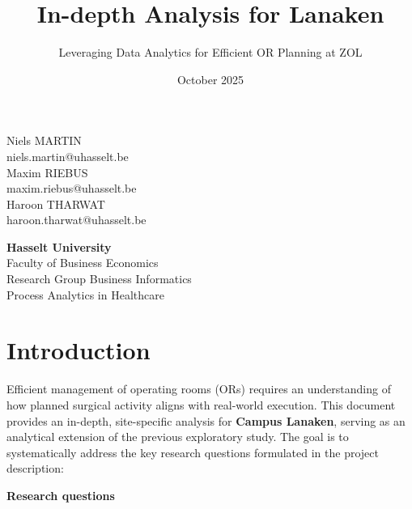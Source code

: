 \documentclass[
]{article}
\title{In-depth Analysis for Lanaken}
\subtitle{Leveraging Data Analytics for Efficient OR Planning at ZOL}
\author{}
\date{\vspace{-2.5em}October 2025}
\begin{document}
\maketitle

\begin{center}
\vspace{2cm}

Niels MARTIN\\
niels.martin@uhasselt.be\\[0.5em]
Maxim RIEBUS\\
maxim.riebus@uhasselt.be\\[0.5em]
Haroon THARWAT\\
haroon.tharwat@uhasselt.be\\

\vspace{6cm}

\textbf{Hasselt University} \\
Faculty of Business Economics \\
Research Group Business Informatics \\
Process Analytics in Healthcare
\end{center}

\newpage
\tableofcontents
\newpage

\section{Introduction}\label{introduction}

Efficient management of operating rooms (ORs) requires an understanding
of how planned surgical activity aligns with real-world execution. This
document provides an in-depth, site-specific analysis for \textbf{Campus
Lanaken}, serving as an analytical extension of the previous exploratory
study. The goal is to systematically address the key research questions
formulated in the project description:

\textbf{Research questions}
\end{document}
